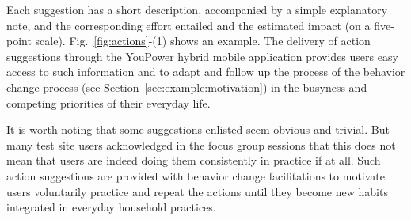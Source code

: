 \documentclass[a4paper]{article}
\begin{document}
Each suggestion has a short description, accompanied by a simple explanatory note, and the corresponding effort entailed and the estimated impact (on a five-point scale). Fig.~\ref{fig:actions}-(1) shows an example. The delivery of action suggestions through the YouPower hybrid mobile application provides users easy access to such information and to adapt and follow up the process of the behavior change process (see Section~\ref{sec:example:motivation}) in the busyness and competing priorities of their everyday life. 

It is worth noting that some suggestions enlisted seem obvious and trivial. But many test site users acknowledged in the focus group sessions that this does not mean that users are indeed doing them consistently in practice if at all. Such action suggestions are provided with behavior change facilitations to motivate users voluntarily practice and repeat the actions until  they become new habits integrated in everyday household practices. 
\end{document}
